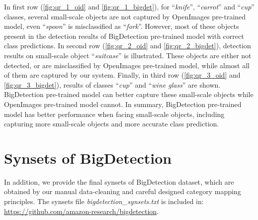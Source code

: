 \documentclass[10pt,twocolumn,letterpaper]{article}
\begin{document}
In first row (\cref{fig:qr_1_oid} and \cref{fig:qr_1_bigdet}), for ``\textit{knife}'', ``\textit{carrot}'' and ``\textit{cup}'' classes, several small-scale objects are not captured by OpenImages pre-trained model, even ``\textit{spoon}'' is misclassified as ``\textit{fork}''.
However, most of these objects present in the detection results of BigDetection pre-trained model with correct class predictions.
In second row (\cref{fig:qr_2_oid} and \cref{fig:qr_2_bigdet}), detection results on small-scale object ``\textit{suitcase}'' is illustrated. These objects are either not detected, or are misclassified by OpenImages pre-trained model, while almost all of them are captured by our system.
Finally, in third row (\cref{fig:qr_3_oid} and \cref{fig:qr_3_bigdet}), results of classes ``\textit{cup}'' and ``\textit{wine glass}'' are shown. BigDetection pre-trained model can better capture these small-scale objects while OpenImages pre-trained model cannot.
In summary, BigDetection pre-trained model has better performance when facing small-scale objects, including capturing more small-scale objects and more accurate class prediction. 
\section{Synsets of BigDetection}
\label{sec:synsets}

In addition, we provide the final synsets of BigDetection dataset, which are obtained by our manual data-cleaning and careful designed category mapping principles. The synsets file \textit{bigdetection\_synsets.txt} is included in: \url{https://github.com/amazon-research/bigdetection}.
 
\end{document}

